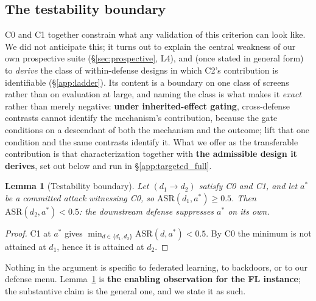 \documentclass{article}
\newtheorem{lemma}{Lemma}
\begin{document}
\begin{table}[htbp]
\begin{tabular}{@{}p{0.115\linewidth}p{0.315\linewidth}p{0.505\linewidth}@{}}
\bottomrule
\end{tabular}
\end{table}

\subsection{The testability boundary}
\label{app:boundary}

C0 and C1 together constrain what any validation of this criterion can look like. We did not anticipate this; it turns out to explain the central weakness of our own prospective suite (§\ref{sec:prospective}, L4), and (once stated in general form) to \emph{derive} the class of within-defense designs in which C2's contribution is identifiable (§\ref{app:ladder}). Its content is a boundary on one class of screens rather than on evaluation at large, and naming the class is what makes it \emph{exact} rather than merely negative: \textbf{under inherited-effect gating}, cross-defense contrasts cannot identify the mechanism's contribution, because the gate conditions on a descendant of both the mechanism and the outcome; lift that one condition and the same contrasts identify it. What we offer as the transferable contribution is that characterization together with \textbf{the admissible design it derives}, set out below and run in §\ref{app:targeted_full}.

\begin{lemma}[Testability boundary]
\label{lem:testability}
Let $(d_1 \to d_2)$ satisfy C0 and C1, and let $a^*$ be a committed attack witnessing C0, so $\mathrm{ASR}(d_1,a^*) \geq 0.5$. Then $\mathrm{ASR}(d_2,a^*) < 0.5$: the downstream defense suppresses $a^*$ \emph{on its own}.
\end{lemma}
\begin{proof}
C1 at $a^*$ gives $\min_{d\in\{d_1,d_2\}}\mathrm{ASR}(d,a^*) < 0.5$. By C0 the minimum is not attained at $d_1$, hence it is attained at $d_2$.
\end{proof}

Nothing in the argument is specific to federated learning, to backdoors, or to our defense menu. Lemma~\ref{lem:testability} is \textbf{the enabling observation for the FL instance}; the substantive claim is the general one, and we state it as such.
\end{document}
